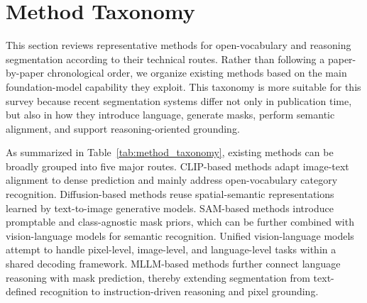 \section{Method Taxonomy}
\label{sec:method_taxonomy}

This section reviews representative methods for open-vocabulary and reasoning segmentation according to their technical routes. 
Rather than following a paper-by-paper chronological order, we organize existing methods based on the main foundation-model capability they exploit. 
This taxonomy is more suitable for this survey because recent segmentation systems differ not only in publication time, but also in how they introduce language, generate masks, perform semantic alignment, and support reasoning-oriented grounding.

As summarized in Table~\ref{tab:method_taxonomy}, existing methods can be broadly grouped into five major routes. 
CLIP-based methods adapt image-text alignment to dense prediction and mainly address open-vocabulary category recognition. 
Diffusion-based methods reuse spatial-semantic representations learned by text-to-image generative models. 
SAM-based methods introduce promptable and class-agnostic mask priors, which can be further combined with vision-language models for semantic recognition. 
Unified vision-language models attempt to handle pixel-level, image-level, and language-level tasks within a shared decoding framework. 
MLLM-based methods further connect language reasoning with mask prediction, thereby extending segmentation from text-defined recognition to instruction-driven reasoning and pixel grounding.

